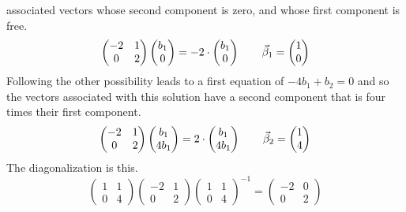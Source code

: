 \begin{exercises}
\begin{answer}
\begin{exparts}
          associated vectors whose second component is zero, and whose
          first component is free.  
          \begin{equation*}
            \begin{pmatrix}
              -2  &1  \\
               0  &2
            \end{pmatrix}
            \begin{pmatrix} b_1 \\ 0 \end{pmatrix}
            =-2\cdot\begin{pmatrix} b_1 \\ 0 \end{pmatrix}
            \qquad
            \vec{\beta}_1=\begin{pmatrix} 1 \\ 0 \end{pmatrix}
          \end{equation*}
          Following the other possibility leads to a first equation of
          $-4b_1+b_2=0$ and so the vectors associated with this 
          solution have a second component that is four times their first
          component.
          \begin{equation*}
            \begin{pmatrix}
              -2  &1  \\
               0  &2
            \end{pmatrix}
            \begin{pmatrix} b_1 \\ 4b_1 \end{pmatrix}
            =2\cdot\begin{pmatrix} b_1 \\ 4b_1 \end{pmatrix}
            \qquad
            \vec{\beta}_2=\begin{pmatrix} 1 \\ 4 \end{pmatrix}
          \end{equation*}
          The diagonalization is this.
          \begin{equation*}
            \begin{pmatrix}
              1  &1  \\
              0  &4
            \end{pmatrix}
            \begin{pmatrix}
              -2  &1  \\
               0  &2
            \end{pmatrix}
            \begin{pmatrix}
              1  &1  \\
              0  &4
            \end{pmatrix}^{-1}
            =
            \begin{pmatrix}
              -2  &0  \\
               0  &2
            \end{pmatrix}
          \end{equation*}

\end{exparts}
\end{answer}
\end{exercises}
